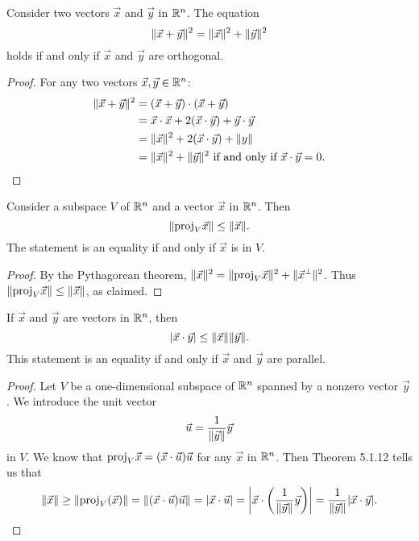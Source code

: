 \documentclass[a4paper,8pt]{article}
\begin{document}
\begin{outline}
    Consider two vectors \(\vec{x}\) and \(\vec{y}\) in \(\mathbb{R}^n\). The equation \[\|\vec{x}+\vec{y}\|^2 =
    \|\vec{x}\|^2 + \|\vec{y}\|^2 \] holds if and only if \(\vec{x}\) and \(\vec{y}\) are orthogonal.

    \begin{proof}
      For any two vectors \(\vec{x}, \vec{y} \in \mathbb{R}^n\):
      \begin{align*}
        \|\vec{x}+\vec{y}\|^2 &= (\vec{x}+\vec{y})\cdot(\vec{x}+\vec{y}) \\
                                 &= \vec{x}\cdot\vec{x} + 2(\vec{x}\cdot\vec{y}) + \vec{y}\cdot\vec{y} \\
                                 &= \|\vec{x}\|^2+2(\vec{x}\cdot\vec{y})+\|y\| \\
                                 &= \|\vec{x}\|^2+\|\vec{y}\|^2\text{ if and only if }\vec{x}\cdot\vec{y} = 0\text{.}
      \end{align*}
    \end{proof}

    Consider a subspace \(V\) of \(\mathbb{R}^n\) and a vector \(\vec{x}\) in \(\mathbb{R}^n\). Then
    \[\|\text{proj}_V\vec{x}\| \leq \|\vec{x}\|\text{.}\] The statement is an equality if and only
    if \(\vec{x}\) is in \(V\).

    \begin{proof}
      By the Pythagorean theorem, \(\|\vec{x}\|^2 = \|\text{proj}_V\vec{x}\|^2 + \|\vec{x}^{\perp}\|^2\).
      Thus \(\|\text{proj}_V\vec{x}\| \leq \|\vec{x}\|\), as claimed.
    \end{proof}

    If \(\vec{x}\) and \(\vec{y}\) are vectors in \(\mathbb{R}^n\), then \[|\vec{x}\cdot\vec{y}| \leq
    \|\vec{x}\|\|\vec{y}\|\text{.}\] This statement is an equality if and only if \(\vec{x}\)
    and \(\vec{y}\) are parallel.

    \begin{proof}
      Let \(V\) be a one-dimensional subspace of \(\mathbb{R}^n\) spanned by a nonzero vector \(\vec{y}\).
      We introduce the unit vector \[\vec{u} = \frac{1}{\|\vec{y}\|}\vec{y}\] in \(V\). We know that
      \(\text{proj}_V\vec{x} = (\vec{x}\cdot\vec{u})\vec{u}\) for any \(\vec{x}\) in \(\mathbb{R}^n\). Then Theorem 5.1.12
      tells us that
      \[ \|\vec{x}\|\geq\|\text{proj}_V(\vec{x})\|
         = \|(\vec{x}\cdot\vec{u})\vec{u}\|
         = |\vec{x}\cdot\vec{u}|=\left|\vec{x}\cdot\left(\frac{1}{\|\vec{y}\|}\vec{y}\right)\right|
         = \frac{1}{\|\vec{y}\|}|\vec{x}\cdot\vec{y}|\text{.}
      \]
    \end{proof}


\end{outline}
\end{document}
